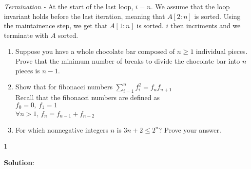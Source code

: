 \documentclass[9pt]{article}
\def\solutions{1}
\begin{document}
        \textit{Termination - } At the start of the last loop, $i=n$. We assume that the loop invariant holds before the last iteration, meaning that $A[2 : n]$ is sorted.  Using the maintainence step, we get that $A[1: n]$ is sorted. $i$ then incriments and we terminate with $A$ sorted.\\
        \fi
        
        \newpage
        
        
        
        
        \vspace{5mm}
        
        \item
        
        
        
        \begin{enumerate}
            
            \item Suppose you have a whole chocolate bar composed of $n\geq 1$ individual pieces.  Prove that the minimum number of breaks to divide the chocolate bar into $n$ pieces is $n-1$. 
            
            \item{
            Show that for fibonacci numbers $\sum_{i=1}^n f_i^2 = f_{n}f_{n+1}$\\
            Recall that the fibonacci numbers are defined as \\
            $f_0 = 0,\ f_1=1$ \\
            $\forall n>1$, $f_n=f_{n-1} + f_{n-2}$}
            
            \item For which nonnegative integers $n$ is $3n+2 \leq 2^n$? Prove your answer.
            
        \end{enumerate}
        
        \if\solutions1
        \vspace{3mm}
        
        {\bf Solution}: \\
        
\end{document}
